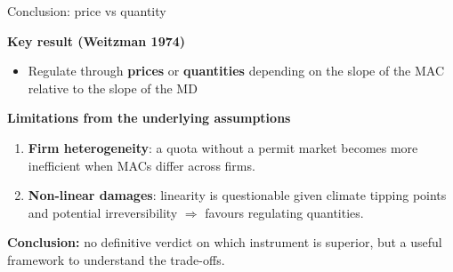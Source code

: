 \documentclass{beamer}
\begin{document}
\begin{frame}[label=w7_conclusion]{Conclusion: price vs quantity}

\textbf{Key result (Weitzman 1974)}
\begin{itemize}
    \item Regulate through \textbf{prices} or \textbf{quantities} depending on the slope of the MAC relative to the slope of the MD
\end{itemize}

\vspace{0.4cm}
\textbf{Limitations from the underlying assumptions}
\begin{enumerate}
    \item \textbf{Firm heterogeneity}: a quota without a permit market becomes more inefficient when MACs differ across firms.

    \item \textbf{Non-linear damages}: linearity is questionable given climate tipping points and potential irreversibility $\Rightarrow$ favours regulating quantities.
\end{enumerate}

\vspace{0.4cm}
\textbf{Conclusion:} no definitive verdict on which instrument is superior, but a useful framework to understand the trade-offs.

\end{frame}
\end{document}

